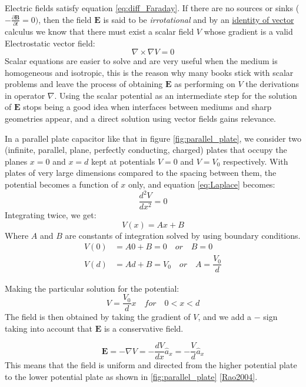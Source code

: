 Electric fields satisfy equation \ref{eq:diff_Faraday}. If there are no sources or sinks ($- \frac{\partial \mathbf{B}}{\partial t}=0)$, then the field $\mathbf{E}$ is said to be \textit{irrotational} and by an \href{http://ebooksgo.org/mathematics/Vector_Identity.pdf}{identity of vector} calculus we know that there must exist a scalar field $V$ whose gradient is a valid Electrostatic vector field:
\begin{equation}
\nabla\times\nabla V = 0
\label{eq:Laplace}
\end{equation}
Scalar equations are easier to solve and are very useful when the medium is homogeneous and isotropic, this is the reason why many books stick with scalar problems and leave the process of obtaining $\mathbf{E}$ as performing on $V$ the derivations in operator $\nabla$. Using the scalar potential as an intermediate step for the solution of $\mathbf{E}$ stops being a good idea when interfaces between mediums and sharp geometries appear, and a direct solution using vector fields gains relevance.

In a parallel plate capacitor like that in figure \ref{fig:parallel_plate}, we consider two (infinite, parallel, plane, perfectly conducting, charged) plates that occupy the planes $x = 0$ and $x = d$ kept at potentials $V = 0$ and $V = V_0$ respectively.  
With plates of very large dimensions compared to the spacing between them, the potential becomes a function of $x$ only, and equation \ref{eq:Laplace} becomes:
$$\dfrac{d^2V}{d x^2}=0$$ Integrating twice, we get: 
\begin{equation}
V(x) = Ax + B
\end{equation}
Where $A$  and $B$ are constants of integration solved by using boundary conditions.
\begin{align*}
V(0) &= A0 + B = 0 \quad or \quad B = 0\\
V(d) &= Ad + B = V_0 \quad or \quad A = \dfrac{V_0}{d}
\end{align*}

Making the particular solution for the potential:
$$V=\dfrac{V_0}{d}x \quad for \quad 0<x<d$$ 
The field is then obtained by taking the gradient of $V$, and we add a $-$ sign taking into account that $\mathbf{E}$ is a conservative field.

\begin{equation}
\mathbf{E}= -\nabla V = - \dfrac{dV}{dx}\hat{a}_x = -\dfrac{V}{d}\hat{a}_x
\end{equation}
This means that the field is uniform and directed from the higher potential plate to the lower potential plate as shown in \ref{fig:parallel_plate} \ref{Rao2004}.

